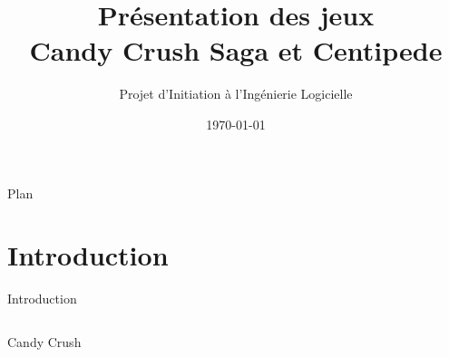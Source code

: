 \documentclass{beamer}
\title[\texorpdfstring{Présentation Candy Crush/Centipede}{}]{\texorpdfstring{Présentation des jeux\\Candy Crush Saga et Centipede}{}}
\subtitle[\texorpdfstring{Projet d'Initiation à l'Ingénierie Logicielle}{}]{\texorpdfstring{Projet d'Initiation à l'Ingénierie Logicielle}{}}
\author[\texorpdfstring{Groupe 3 : Mohamed, Émile, Théo, Alexis}{}]{\texorpdfstring{Groupe \no 3 \\Mohamed \bsc{Lakhal} \and Émile \bsc{Jeannin} \\ \and Théo \bsc{Mottet} \and Alexis \bsc{Cabodi}}{}}
\institute[UFC]{\texorpdfstring{Université de Franche-Comté}{}}
\date{\texorpdfstring{\today}{}}
\begin{document}
\maketitle

\begin{frame}{Plan}
	\tableofcontents
\end{frame}

\section{Introduction}
\begin{frame}{Introduction}
	\begin{columns}
		\begin{column}{0.5\textwidth}
			\begin{block}{Candy Crush}
\end{block}
\end{column}
\end{columns}
\end{frame}
\end{document}
